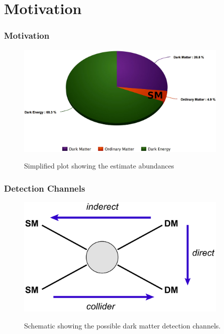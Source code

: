\documentclass{beamer}
\begin{document}


\section{Motivation}
\begin{frame}
\frametitle{Motivation}

\begin{figure}[!tbp]
	\centering
	\includegraphics[width=0.9\textwidth]{pictures/pie}\label{fig3}
	\caption{{\scriptsize Simplified plot showing the estimate abundances}}
	
\end{figure}

\end{frame}


\begin{frame}
\frametitle{Detection Channels}

\begin{figure}[!tbp]
	\centering
	\includegraphics[width=0.9\textwidth]{pictures/Schem}\label{fig4}
	\caption{{\scriptsize Schematic showing the possible dark matter detection channels.}}
	
\end{figure}

\end{frame}
\end{document}
